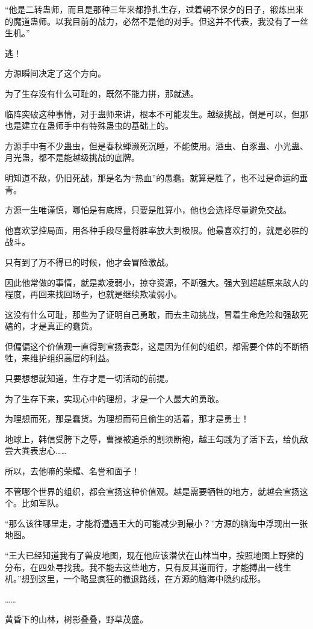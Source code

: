 \begin{this_body}
“他是二转蛊师，而且是那种三年来都挣扎生存，过着朝不保夕的日子，锻炼出来的魔道蛊师。以我目前的战力，必然不是他的对手。但这并不代表，我没有了一丝生机。”

逃！

方源瞬间决定了这个方向。

为了生存没有什么可耻的，既然不能力拼，那就逃。

临阵突破这种事情，对于蛊师来讲，根本不可能发生。越级挑战，倒是可以，但那也是建立在蛊师手中有特殊蛊虫的基础上的。

方源手中有不少蛊虫，但是春秋蝉濒死沉睡，不能使用。酒虫、白豕蛊、小光蛊、月光蛊，都不是能越级挑战的底牌。

明知道不敌，仍旧死战，那是名为“热血”的愚蠢。就算是胜了，也不过是命运的垂青。

方源一生唯谨慎，哪怕是有底牌，只要是胜算小，他也会选择尽量避免交战。

他喜欢掌控局面，用各种手段尽量将胜率放大到极限。他最喜欢打的，就是必胜的战斗。

只有到了万不得已的时候，他才会冒险激战。

因此他常做的事情，就是欺凌弱小，掠夺资源，不断强大。强大到超越原来敌人的程度，再回来找回场子，也就是继续欺凌弱小。

这没有什么可耻，那些为了证明自己勇敢，而去主动挑战，冒着生命危险和强敌死磕的，才是真正的蠢货。

但偏偏这个价值观一直得到宣扬表彰，这是因为任何的组织，都需要个体的不断牺牲，来维护组织高层的利益。

只要想想就知道，生存才是一切活动的前提。

为了生存下来，实现心中的理想，才是一个人最大的勇敢。

为理想而死，那是蠢货。为理想而苟且偷生的活着，那才是勇士！

地球上，韩信受胯下之辱，曹操被追杀的割须断袍，越王勾践为了活下去，给仇敌尝大粪表忠心……

所以，去他嘛的荣耀、名誉和面子！

不管哪个世界的组织，都会宣扬这种价值观。越是需要牺牲的地方，就越会宣扬这个。比如军队。

“那么该往哪里走，才能将遭遇王大的可能减少到最小？”方源的脑海中浮现出一张地图。

“王大已经知道我有了兽皮地图，现在他应该潜伏在山林当中，按照地图上野猪的分布，在四处寻找我。我不能去这些地方，只有反其道而行，才能搏出一线生机。”想到这里，一个略显疯狂的撤退路线，在方源的脑海中隐约成形。

……

黄昏下的山林，树影叠叠，野草茂盛。


\end{this_body}
